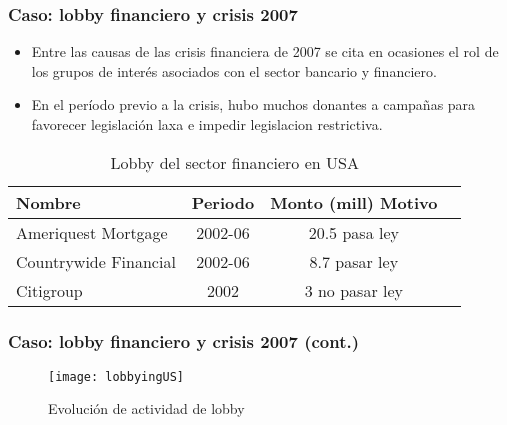 \documentclass[handout,final,xcolor=dvipsnames]{beamer}
\begin{document}
\begin{frame}\frametitle{Caso: lobby financiero y crisis 2007}
\begin{itemize}\itemsep 15pt
\item Entre las causas de las crisis financiera de 2007 se cita en
  ocasiones el rol de los grupos de interés asociados con el sector
  bancario y financiero. 
\item En el período previo a la crisis, hubo muchos donantes a
  campañas para favorecer legislación laxa e impedir legislacion
  restrictiva. 
\end{itemize}
\begin{table}[htbp]
  \centering
  \begin{tabular}[htbp]{lccc}
    Nombre	&	Periodo	&	Monto (mill)		Motivo		\\ \hline
Ameriquest Mortgage	&	2002-06	&	20.5		pasa
                                          ley		\\ \hline
Countrywide Financial	&	2002-06	&	8.7		pasar ley		\\ \hline
Citigroup	&	2002	&	3		no pasar ley		\\ \hline

  \end{tabular}
  \caption{Lobby del sector financiero en USA}
  \label{tab:4}
\end{table}
\end{frame}



\begin{frame}\frametitle{Caso: lobby financiero y crisis 2007 (cont.)}
\begin{figure}[htbp]\vspace{-0.5cm}
  \centering
  \texttt{[image: lobbyingUS]}
  \caption{Evolución de actividad de lobby}  \label{fig:5}
\end{figure}
\end{frame}
\end{document}
